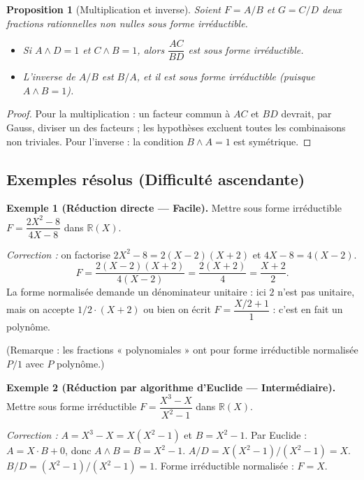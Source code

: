 \documentclass[12pt,a4paper]{report}
\newtheorem{proposition}[theoreme]{Proposition}
\theoremstyle{definition}
\theoremstyle{remark}
\begin{document}
\begin{proposition}[Multiplication et inverse]
Soient $F = A/B$ et $G = C/D$ deux fractions rationnelles non nulles sous forme irréductible.
\begin{itemize}
    \item Si $A \wedge D = 1$ et $C \wedge B = 1$, alors $\dfrac{AC}{BD}$ est sous forme irréductible.
    \item L'inverse de $A/B$ est $B/A$, et il est sous forme irréductible (puisque $A \wedge B = 1$).
\end{itemize}
\end{proposition}

\begin{proof}
Pour la multiplication : un facteur commun à $AC$ et $BD$ devrait, par Gauss, diviser un des facteurs ; les hypothèses excluent toutes les combinaisons non triviales. Pour l'inverse : la condition $B \wedge A = 1$ est symétrique.
\end{proof}

\subsection{Exemples résolus (Difficulté ascendante)}

\textbf{Exemple 1 (Réduction directe --- Facile).}
Mettre sous forme irréductible $F = \dfrac{2X^2 - 8}{4X - 8}$ dans $\mathbb{R}(X)$.

\textit{Correction :} on factorise $2X^2 - 8 = 2(X - 2)(X + 2)$ et $4X - 8 = 4(X - 2)$.
\[ F = \frac{2(X - 2)(X + 2)}{4(X - 2)} = \frac{2(X + 2)}{4} = \frac{X + 2}{2}. \]
La forme normalisée demande un dénominateur unitaire : ici $2$ n'est pas unitaire, mais on accepte $1/2 \cdot (X + 2)$ ou bien on écrit $F = \dfrac{X/2 + 1}{1}$ : c'est en fait un polynôme.

(Remarque : les fractions « polynomiales » ont pour forme irréductible normalisée $P/1$ avec $P$ polynôme.)

\medskip

\textbf{Exemple 2 (Réduction par algorithme d'Euclide --- Intermédiaire).}
Mettre sous forme irréductible $F = \dfrac{X^3 - X}{X^2 - 1}$ dans $\mathbb{R}(X)$.

\textit{Correction :}
$A = X^3 - X = X(X^2 - 1)$ et $B = X^2 - 1$. Par Euclide : $A = X \cdot B + 0$, donc $A \wedge B = B = X^2 - 1$.
$A / D = X(X^2 - 1)/(X^2 - 1) = X$.
$B / D = (X^2 - 1)/(X^2 - 1) = 1$.
Forme irréductible normalisée : $F = X$.

\medskip
\end{document}
